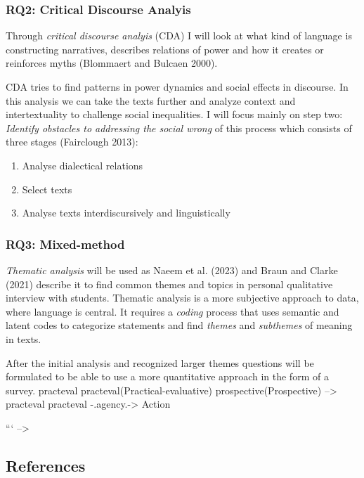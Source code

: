 \documentclass[
  letterpaper,
  DIV=11,
  numbers=noendperiod]{scrartcl}
\providecommand{\tightlist}{%
  \setlength{\itemsep}{0pt}\setlength{\parskip}{0pt}}
\begin{document}
\subsubsection{RQ2: Critical Discourse
Analyis}\label{rq2-critical-discourse-analyis}

Through \emph{critical discourse analyis} (CDA) I will look at what kind
of language is constructing narratives, describes relations of power and
how it creates or reinforces myths (Blommaert and Bulcaen 2000).

CDA tries to find patterns in power dynamics and social effects in
discourse. In this analysis we can take the texts further and analyze
context and intertextuality to challenge social inequalities. I will
focus mainly on step two: \emph{Identify obstacles to addressing the
social wrong} of this process which consists of three stages (Fairclough
2013):

\begin{enumerate}
\def\labelenumi{\arabic{enumi}.}
\tightlist
\item
  Analyse dialectical relations
\item
  Select texts
\item
  Analyse texts interdiscursively and linguistically
\end{enumerate}

\subsubsection{RQ3: Mixed-method}\label{rq3-mixed-method}

\emph{Thematic analysis} will be used as Naeem et al. (2023) and Braun
and Clarke (2021) describe it to find common themes and topics in
personal qualitative interview with students. Thematic analysis is a
more subjective approach to data, where language is central. It requires
a \emph{coding} process that uses semantic and latent codes to
categorize statements and find \emph{themes} and \emph{subthemes} of
meaning in texts.

After the initial analysis and recognized larger themes questions will
be formulated to be able to use a more quantitative approach in the form
of a survey. practeval practeval(Practical-evaluative)
prospective(Prospective) --\textgreater{} practeval practeval
-.agency.-\textgreater{} Action

``` --\textgreater{}

\subsection*{References}\label{references}
\end{document}
